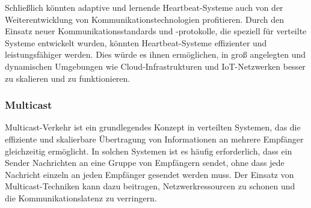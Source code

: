 \documentclass[../vs-script-first-v01.tex]{subfiles}
\begin{document}
Schließlich könnten adaptive und lernende Heartbeat-Systeme auch von der Weiterentwicklung von Kommunikationstechnologien profitieren. Durch den Einsatz neuer Kommunikationsstandards und -protokolle, die speziell für verteilte Systeme entwickelt wurden, könnten Heartbeat-Systeme effizienter und leistungsfähiger werden. Dies würde es ihnen ermöglichen, in groß angelegten und dynamischen Umgebungen wie Cloud-Infrastrukturen und IoT-Netzwerken besser zu skalieren und zu funktionieren.
\newpage
\subsubsection{Multicast}

Multicast-Verkehr ist ein grundlegendes Konzept in verteilten Systemen, das die effiziente und skalierbare Übertragung von Informationen an mehrere Empfänger gleichzeitig ermöglicht. In solchen Systemen ist es häufig erforderlich, dass ein Sender Nachrichten an eine Gruppe von Empfängern sendet, ohne dass jede Nachricht einzeln an jeden Empfänger gesendet werden muss. Der Einsatz von Multicast-Techniken kann dazu beitragen, Netzwerkressourcen zu schonen und die Kommunikationslatenz zu verringern.
\end{document}
